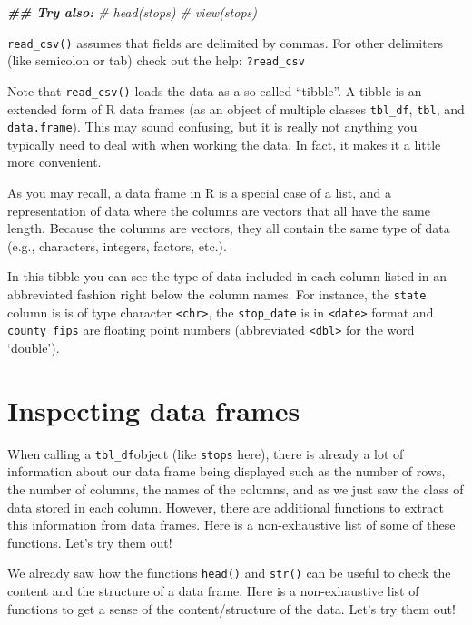 \documentclass[
]{book}
\newenvironment{Shaded}{\begin{snugshade}}{\end{snugshade}}
\newcommand{\CommentTok}[1]{\textcolor[rgb]{0.56,0.35,0.01}{\textit{#1}}}
\newcommand{\DocumentationTok}[1]{\textcolor[rgb]{0.56,0.35,0.01}{\textbf{\textit{#1}}}}
\begin{document}
\begin{Shaded}
\begin{Highlighting}[]
\DocumentationTok{\#\# Try also:}
\CommentTok{\# head(stops)}
\CommentTok{\# view(stops)}
\end{Highlighting}
\end{Shaded}

\texttt{read\_csv()} assumes that fields are delimited by commas. For other delimiters (like semicolon or tab) check out the help: \texttt{?read\_csv}

Note that \texttt{read\_csv()} loads the data as a so called ``tibble''. A tibble is an extended form of R data frames (as an object of multiple classes \texttt{tbl\_df}, \texttt{tbl}, and \texttt{data.frame}). This may sound confusing, but it is really not anything you typically need to deal with when working the data. In fact, it makes it a little more convenient.

As you may recall, a data frame in R is a special case of a list, and a representation of data where the columns are vectors that all have the same length. Because the columns are vectors, they all contain the same type of data (e.g., characters, integers, factors, etc.).

In this tibble you can see the type of data included in each column listed in an abbreviated fashion right below the column names. For instance, the \texttt{state} column is is of type character \texttt{\textless{}chr\textgreater{}}, the \texttt{stop\_date} is in \texttt{\textless{}date\textgreater{}} format and \texttt{county\_fips} are floating point numbers (abbreviated \texttt{\textless{}dbl\textgreater{}} for the word `double').

\hypertarget{inspecting-data-frames}{%
\section{Inspecting data frames}\label{inspecting-data-frames}}

When calling a \texttt{tbl\_df}object (like \texttt{stops} here), there is already a lot of information about our data frame being displayed such as the number of rows, the number of columns, the names of the columns, and as we just saw the class of data stored in each column. However, there are additional functions to extract this information from data frames. Here is a non-exhaustive list of some of these functions. Let's try them out!

We already saw how the functions \texttt{head()} and \texttt{str()} can be useful to check the
content and the structure of a data frame. Here is a non-exhaustive list of
functions to get a sense of the content/structure of the data. Let's try them out!
\end{document}

